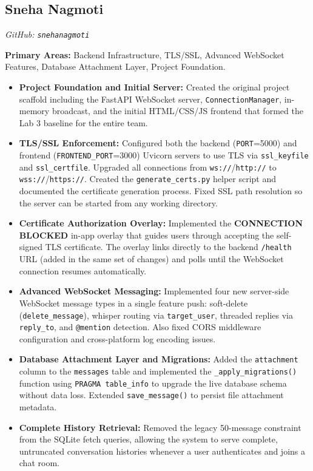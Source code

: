 \documentclass[12pt, a4paper]{article}
\begin{document}
\subsection{Sneha Nagmoti}
\textit{GitHub: \texttt{snehanagmoti}}

\textbf{Primary Areas:} Backend Infrastructure, TLS/SSL, Advanced WebSocket Features, Database Attachment Layer, Project Foundation.

\begin{itemize}[leftmargin=*]
    \item \textbf{Project Foundation and Initial Server:} Created the original project scaffold including the FastAPI WebSocket server, \texttt{ConnectionManager}, in-memory broadcast, and the initial HTML/CSS/JS frontend that formed the Lab 3 baseline for the entire team.

    \item \textbf{TLS/SSL Enforcement:} Configured both the backend (\texttt{PORT}=5000) and frontend (\texttt{FRONTEND\_PORT}=3000) Uvicorn servers to use TLS via \texttt{ssl\_keyfile} and \texttt{ssl\_certfile}. Upgraded all connections from \texttt{ws://}/\texttt{http://} to \texttt{wss://}/\texttt{https://}. Created the \texttt{generate\_certs.py} helper script and documented the certificate generation process. Fixed SSL path resolution so the server can be started from any working directory.

    \item \textbf{Certificate Authorization Overlay:} Implemented the \textbf{CONNECTION BLOCKED} in-app overlay that guides users through accepting the self-signed TLS certificate. The overlay links directly to the backend \texttt{/health} URL (added in the same set of changes) and polls until the WebSocket connection resumes automatically.

    \item \textbf{Advanced WebSocket Messaging:} Implemented four new server-side WebSocket message types in a single feature push: soft-delete (\texttt{delete\_message}), whisper routing via \texttt{target\_user}, threaded replies via \texttt{reply\_to}, and \texttt{@mention} detection. Also fixed CORS middleware configuration and cross-platform log encoding issues.

    \item \textbf{Database Attachment Layer and Migrations:} Added the \texttt{attachment} column to the \texttt{messages} table and implemented the \texttt{\_apply\_migrations()} function using \texttt{PRAGMA table\_info} to upgrade the live database schema without data loss. Extended \texttt{save\_message()} to persist file attachment metadata.
    \item \textbf{Complete History Retrieval:} Removed the legacy 50-message constraint from the SQLite fetch queries, allowing the system to serve complete, untruncated conversation histories whenever a user authenticates and joins a chat room.
\end{itemize}
\end{document}
